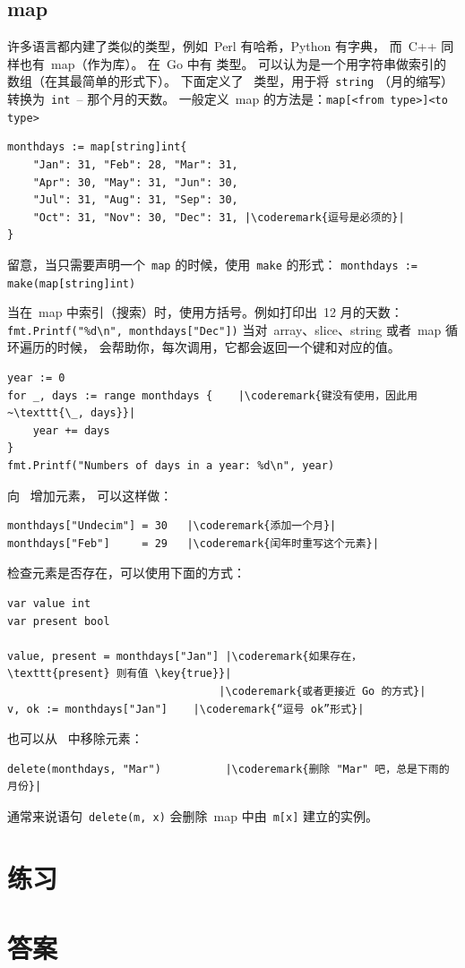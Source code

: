 \subsection{map}
\label{sec:maps}
许多语言都内建了类似的类型，例如~Perl 有哈希，Python 有字典，
而~C++ 同样也有~map（作为库）。 
在~Go 中有  类型。 
可以认为是一个用字符串做索引的数组（在其最简单的形式下）。
下面定义了~ 类型，用于将~\lstinline{string} （月的缩写）转换为~\lstinline{int}~-- 那个月的天数。 
一般定义~map 的方法是：\verb|map[<from type>]<to type>|

\begin{lstlisting}
monthdays := map[string]int{
	"Jan": 31, "Feb": 28, "Mar": 31, 
	"Apr": 30, "May": 31, "Jun": 30, 
	"Jul": 31, "Aug": 31, "Sep": 30, 
	"Oct": 31, "Nov": 30, "Dec": 31, |\coderemark{逗号是必须的}|
}		    
\end{lstlisting}
留意，当只需要声明一个~\lstinline{map} 的时候，使用~\lstinline{make} 的形式：
\lstinline|monthdays := make(map[string]int)|

当在~map 中索引（搜索）时，使用方括号。例如打印出~12 月的天数：
\lstinline{fmt.Printf("%d\n", monthdays["Dec"])}\newline
当对~array、slice、string 或者~map 循环遍历的时候，
会帮助你，每次调用，它都会返回一个键和对应的值。
\begin{lstlisting}
year := 0
for _, days := range monthdays {    |\coderemark{键没有使用，因此用~\texttt{\_, days}}|
    year += days
}
fmt.Printf("Numbers of days in a year: %d\n", year)
\end{lstlisting}
向~ 增加元素， 可以这样做：
\begin{lstlisting}
monthdays["Undecim"] = 30	|\coderemark{添加一个月}|
monthdays["Feb"]     = 29	|\coderemark{闰年时重写这个元素}|
\end{lstlisting}
检查元素是否存在，可以使用下面的方式\cite{go_course_day2}：
\begin{lstlisting}
var value int
var present bool

value, present = monthdays["Jan"] |\coderemark{如果存在，\texttt{present} 则有值 \key{true}}|
                                 |\coderemark{或者更接近 Go 的方式}|
v, ok := monthdays["Jan"]	 |\coderemark{“逗号 ok”形式}|
\end{lstlisting}
也可以从~ 中移除元素：
\begin{lstlisting}
delete(monthdays, "Mar")          |\coderemark{删除 "Mar" 吧，总是下雨的月份}|
\end{lstlisting}
通常来说语句~\lstinline{delete(m, x)} 会删除~map 中由~\lstinline{m[x]} 建立的实例。

\section{练习}








\cleardoublepage
\section{答案}
\shipoutAnswer
